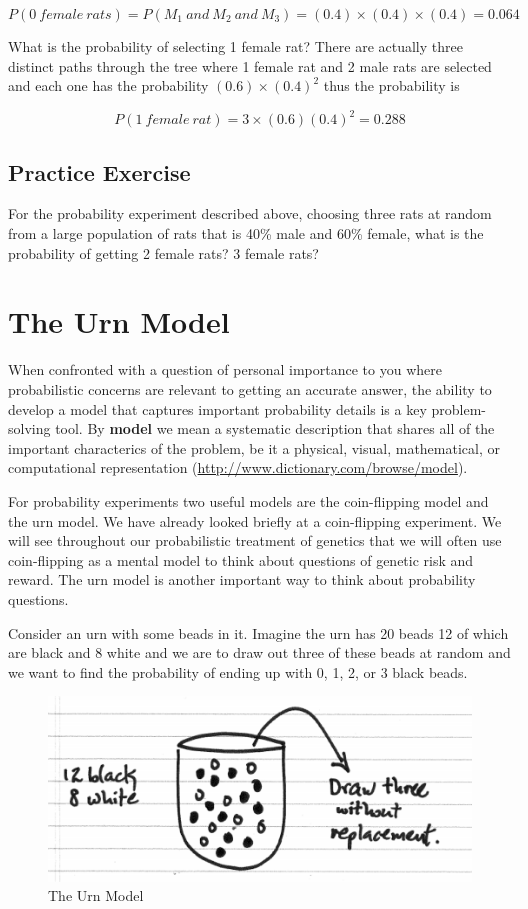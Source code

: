 \documentclass[]{book}
\theoremstyle{definition}
\theoremstyle{definition}
\theoremstyle{definition}
\theoremstyle{remark}
\begin{document}
\[P(0\ female\ rats) = P(M_{1}\ and\ M_{2}\ and\ M_{3}) = (0.4) \times (0.4) \times (0.4) = 0.064\]

What is the probability of selecting 1 female rat? There are actually
three distinct paths through the tree where 1 female rat and 2 male rats
are selected and each one has the probability \((0.6) \times (0.4)^2\)
thus the probability is

\[P(1\ female\ rat) = 3 \times (0.6) (0.4)^2 = 0.288\]

\subsection{Practice Exercise}\label{practice-exercise-5}

For the probability experiment described above, choosing three rats at
random from a large population of rats that is 40\% male and 60\%
female, what is the probability of getting 2 female rats? 3 female rats?

\section{The Urn Model}\label{the_urn_model}

When confronted with a question of personal importance to you where
probabilistic concerns are relevant to getting an accurate answer, the
ability to develop a model that captures important probability details
is a key problem-solving tool. By \textbf{model} we mean a systematic
description that shares all of the important characterics of the
problem, be it a physical, visual, mathematical, or computational
representation (\url{http://www.dictionary.com/browse/model}).

For probability experiments two useful models are the coin-flipping
model and the urn model. We have already looked briefly at a
coin-flipping experiment. We will see throughout our probabilistic
treatment of genetics that we will often use coin-flipping as a mental
model to think about questions of genetic risk and reward. The urn model
is another important way to think about probability questions.

Consider an urn with some beads in it. Imagine the urn has 20 beads 12
of which are black and 8 white and we are to draw out three of these
beads at random and we want to find the probability of ending up with 0,
1, 2, or 3 black beads.

\begin{figure}

{\centering \includegraphics[width=0.6\linewidth]{01-basics-figures/urn1_picture} 

}

\caption{The Urn Model}\label{fig:nice-fig-36}
\end{figure}
\end{document}
